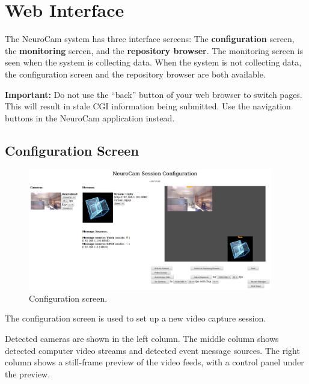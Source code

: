 
\chapter{Web Interface}
\label{gui}

The NeuroCam system has three interface screens: The \textbf{configuration}
screen, the \textbf{monitoring} screen, and the \textbf{repository browser}.
The monitoring screen is seen when the system is collecting data. When the
system is not collecting data, the configuration screen and the repository
browser are both available.

\textbf{Important:} Do not use the ``back'' button of your web browser to
switch pages. This will result in stale CGI information being submitted.
Use the navigation buttons in the NeuroCam application instead.

\section{Configuration Screen}
\label{gui-config}

\begin{figure}[h]
\begin{center}
\includegraphics[width=0.95\textwidth]{pics-gui/gui-config.png}
\end{center}
\caption{Configuration screen.}\label{fig-gui-config}
\end{figure}


The configuration screen is used to set up a new video capture session.

Detected cameras are shown in the left column. The middle column shows
detected computer video streams and detected event message sources. The
right column shows a still-frame preview of the video feeds, with a control
panel under the preview.

